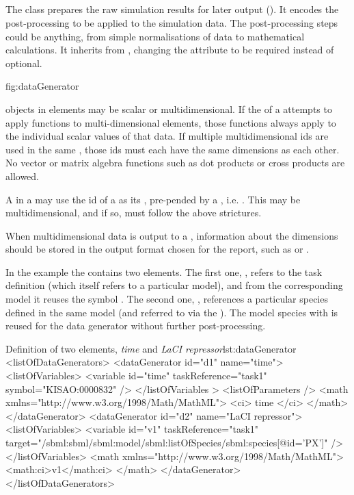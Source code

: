 \subsection{}
\label{class:dataGenerator}

The  class prepares the raw simulation results for later output (). It encodes the post-processing  to be applied to the simulation data. The post-processing steps could be anything, from simple normalisations of data to mathematical calculations.  It inherits from \Calculation, changing the  attribute to be required instead of optional.

 {fig:dataGenerator}

\begin{blockChanged}
\Variable objects in \DataGenerator elements may be scalar or multidimensional.  If the \Math of a \DataGenerator attempts to apply functions to multi-dimensional elements, those functions always apply to the individual scalar values of that data.  If multiple multidimensional \Variable ids are used in the same \Math, those ids must each have the same dimensions as each other.  No vector or matrix algebra functions such as dot products or cross products are allowed.

A \Variable in a \DataGenerator may use the id of a \DataSource as its , pre-pended by a , i.e. .  This \Variable may be multidimensional, and if so, must follow the above strictures.

When multidimensional data is output to a \Report, information about the dimensions should be stored in the output format chosen for the report, such as \CSV or \HDF.
\end{blockChanged}


In the example the  contains two  elements. 
The first one, , refers to the task definition  (which itself refers to a particular model), and from the corresponding model it reuses the symbol . The second one, , references a particular species defined in the same model (and referred to via the ). The model species with   is reused for the data generator  without further post-processing.
\begin{myXmlLst}{Definition of two  elements, \emph{time} and \emph{LaCI repressor}}{lst:dataGenerator}
<listOfDataGenerators>
	<dataGenerator id="d1" name="time">
		<listOfVariables>
			<variable id="time" taskReference="task1" symbol="KISAO:0000832" />
		</listOfVariables >
		<listOfParameters />
		<math xmlns="http://www.w3.org/1998/Math/MathML">
			<ci> time </ci>
		</math>
	</dataGenerator>
	<dataGenerator id="d2" name="LaCI repressor">
		<listOfVariables>
			<variable id="v1" taskReference="task1" 
				target="/sbml:sbml/sbml:model/sbml:listOfSpecies/sbml:species[@id='PX']" />
		</listOfVariables>
		<math xmlns="http://www.w3.org/1998/Math/MathML">
			<math:ci>v1</math:ci>
		</math>
	</dataGenerator>
</listOfDataGenerators>
\end{myXmlLst}
